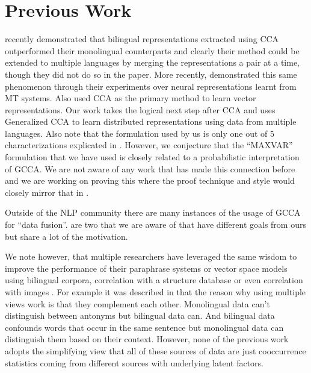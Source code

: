 \documentclass[11pt]{article}
\begin{document}
\section{Previous Work}
\label{sec:previouswork}
\cite{faruqui2014improving} recently demonstrated that bilingual
representations extracted using CCA outperformed their monolingual 
counterparts and  clearly their method could be extended to
multiple languages by merging the representations a pair at a time,
though they did not do so in the paper.
More recently, \cite{felix2014learning} demonstrated this same
phenomenon through their experiments over neural representations learnt from MT
systems. Also \cite{dhillon2011multi,dhillon2012two} used
CCA as the primary method to learn vector representations. Our work takes the logical
next step after CCA and uses Generalized CCA to learn distributed
representations using data from multiple languages. Also note that the
formulation used by us is only one out of 5 characterizations explicated in
\cite{kettenring1971canonical}. However, we conjecture that the
``MAXVAR'' formulation that we have used is closely related to
a probabilistic interpretation of GCCA. We are not aware of any work
that has made this connection before and we are working on proving
this where the proof technique and style would closely mirror that in \cite{bach2005probabilistic}.

Outside of the NLP community there are many instances of the usage of GCCA for
``data fusion''.  \cite{sun2013generalized,tripathi2011data} are two
that we are aware of that have different goals from ours but share a
lot of the motivation.

We note however, that multiple researchers have leveraged the
same wisdom to improve the performance of their paraphrase systems or
vector space models using bilingual
corpora\cite{bannard2005paraphrasing,Huang2012Improving,zou2013bilingual}, 
correlation with a structure database \cite{yu2014improving} or even
correlation with images \cite{bruni2012distributional}.
For example it was described in \cite{ganitkevitch2013ppdb}
that the reason why using multiple views work is 
that they complement each other. Monolingual data can't distinguish
between antonyms but bilingual data can. And bilingual data confounds
words that occur in the same sentence but monolingual data can
distinguish them based on their context. However, none of the previous
work adopts the simplifying  view that 
all of these sources of data are just cooccurrence 
statistics coming from different sources with underlying latent
factors. 
\end{document}
